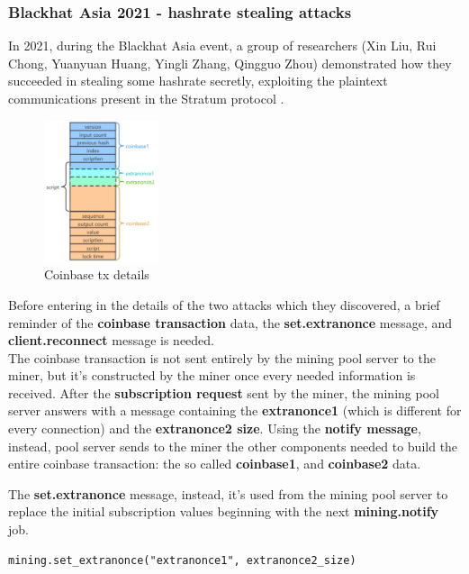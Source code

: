 \subsubsection{Blackhat Asia 2021 - hashrate stealing attacks}
In 2021, during the Blackhat Asia event, a group of researchers (Xin Liu, Rui Chong, Yuanyuan Huang, Yingli Zhang, Qingguo Zhou) demonstrated how they succeeded in stealing some hashrate secretly, exploiting the plaintext communications present in the Stratum protocol \cite{blackhatasia}.\\
\begin{figure}
    \centering
    \includegraphics[width=0.30\textwidth]{Figures/stratum/stratum3.png}
    \caption{Coinbase tx details}
    \label{fig:stratum3}
\end{figure}
Before entering in the details of the two attacks which they discovered, a brief reminder of the \textbf{coinbase transaction} data, the \textbf{set.extranonce} message, and \textbf{client.reconnect} message is needed.\\
The coinbase transaction is not sent entirely by the mining pool server to the miner, but it's constructed by the miner once every needed information is received.
After the \textbf{subscription request} sent by the miner, the mining pool server answers with a message containing the \textbf{extranonce1} (which is different for every connection) and the \textbf{extranonce2 size}.
Using the \textbf{notify message}, instead, pool server sends to the miner the other components needed to build the entire coinbase transaction: the so called \textbf{coinbase1}, and \textbf{coinbase2} data.

\noindent The \textbf{set.extranonce} message, instead, it's used from the mining pool server to replace the initial subscription values beginning with the next \textbf{mining.notify} job.
\begin{verbatim}
mining.set_extranonce("extranonce1", extranonce2_size)
\end{verbatim}

